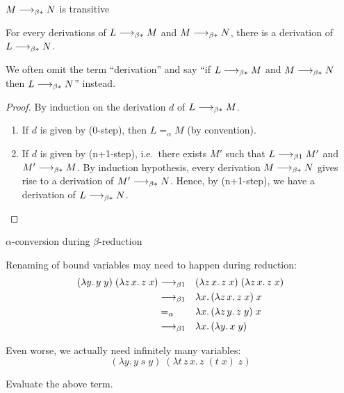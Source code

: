 \begin{frame}{$M \longrightarrow_{\beta*} N$ is transitive}
  \begin{lemma}
    For every derivations of $L \longrightarrow_{\beta*} M$ and $M \longrightarrow_{\beta*} N$, there
    is a derivation of $L \longrightarrow_{\beta*} N$. 
  \end{lemma}
  We often omit the term ``derivation'' and say ``if $L \longrightarrow_{\beta*} M$ and $M \longrightarrow_{\beta*} N$ then $L \longrightarrow_{\beta*} N$'' instead.
  \begin{proof}
    By induction on the derivation $d$ of $L \longrightarrow_{\beta*} M$. 
    \begin{enumerate}
      \item If $d$ is given by (0-step), then $L =_\alpha M$ (by convention).
      \item If $d$ is given by (n+1-step), i.e.\ there exists $M'$ such that
        $L \longrightarrow_{\beta1} M'$ and $M' \longrightarrow_{\beta*} M$. By induction hypothesis,
        every derivation $M \longrightarrow_{\beta*} N$ gives rise to a derivation of $M' \longrightarrow_{\beta*} N$.
        Hence, by (n+1-step), we have a derivation of $L \longrightarrow_{\beta*} N$. 
    \end{enumerate}
  \end{proof}
  
\end{frame}
\begin{frame}{$\alpha$-conversion during $\beta$-reduction}

  Renaming of bound variables may need to happen during reduction:
  \begin{align*}
    (\lambda y.\, y\; y)\; (\lambda z\,x.\, z\;x) 
  & \longrightarrow_{\beta1} && (\lambda z\,x.\, z\;x)\; (\lambda z\,x.\, z\;x) \\
  & \longrightarrow_{\beta1} && \lambda x.\, (\lambda z\,x.\, z\;x) \;x  \\
  & =_\alpha   && \lambda x.\, (\lambda z\,y.\, z\;y) \;x  \\
  & \longrightarrow_{\beta1} && \lambda x.\, (\lambda y.\, x\;y)
  \end{align*}
  
  Even worse, we actually need infinitely many variables:
  \[
    (\lambda y.\,y\; s\; y)\; (\lambda t\,z\,x.\, z\; (t\; x)\; z)
  \]
  \begin{exercise*}
    Evaluate the above term.
  \end{exercise*}
\end{frame}

